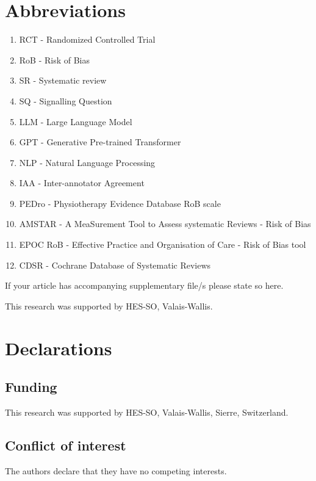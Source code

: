\documentclass[sn-mathphys,Numbered]{sn-jnl}%
\theoremstyle{thmstyleone}%
\theoremstyle{thmstyletwo}%
\theoremstyle{thmstylethree}%
\begin{document}
\section{Abbreviations}%
%
\begin{enumerate}
    \item RCT - Randomized Controlled Trial
    \item RoB - Risk of Bias
    \item SR - Systematic review
    \item SQ - Signalling Question
    \item LLM - Large Language Model
    \item GPT - Generative Pre-trained Transformer
    \item NLP - Natural Language Processing
    \item IAA - Inter-annotator Agreement
    \item PEDro - Physiotherapy Evidence Database RoB scale
    \item AMSTAR - A MeaSurement Tool to Assess systematic Reviews - Risk of Bias
    \item EPOC RoB - Effective Practice and Organisation of Care - Risk of Bias tool
    \item CDSR - Cochrane Database of Systematic Reviews
\end{enumerate}
%
%
%
\backmatter


If your article has accompanying supplementary file/s please state so here. 



This research was supported by HES-SO, Valais-Wallis. 

%
%
%
\section*{Declarations}
%
\subsection*{Funding}
%
This research was supported by HES-SO, Valais-Wallis, Sierre, Switzerland. 
%
%
%
\subsection*{Conflict of interest}
%
The authors declare that they have no competing interests.
%
%
%
\end{document}
